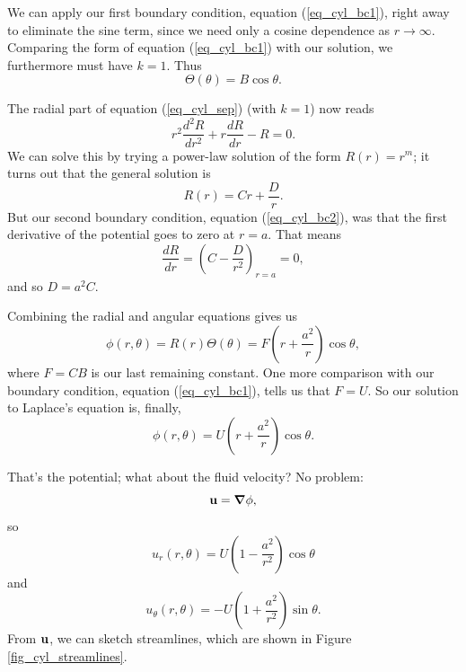 We can apply our first boundary condition, equation (\ref{eq_cyl_bc1}), right away to eliminate the sine term, since we need only a cosine dependence as $r \to \infty$.  Comparing the form of equation (\ref{eq_cyl_bc1}) with our solution, we furthermore must have $k=1$.  Thus 
\begin{equation}
\Theta(\theta) = B \cos \theta.
\end{equation}

The radial part of equation (\ref{eq_cyl_sep}) (with $k = 1$) now reads
\[
r^2 \frac{d^2R}{dr^2} + r \frac{dR}{dr} - R = 0.
\]
We can solve this by trying a power-law solution of the form $R(r) = r^m$; it turns out that the general solution is
\[
R(r) = Cr + \frac{D}{r}.
\]
But our second boundary condition, equation (\ref{eq_cyl_bc2}), was that the first derivative of the potential goes to zero at $r=a$.  That means
\[
\frac{dR}{dr} = \left( C - \frac{D}{r^2} \right)_{r=a} = 0,
\]
and so $D = a^2 C$.

Combining the radial and angular equations gives us
\[
\phi(r, \theta) = R(r) \Theta(\theta) = F \left( r+\frac{a^2}{r} \right) \cos \theta,
\]
where $F=CB$ is our last remaining constant.  One more comparison with our boundary condition, equation (\ref{eq_cyl_bc1}), tells us that $F = U$.  So our solution to Laplace's equation is, finally, 
\begin{equation}
\phi(r, \theta) = U \left( r+\frac{a^2}{r} \right) \cos \theta.
\end{equation}

That's the potential; what about the fluid velocity?  No problem:
\[
\mathbf{u} = \boldsymbol{\nabla} \phi,
\]
so
\begin{equation}
u_r(r, \theta) = U \left( 1 - \frac{a^2}{r^2} \right) \cos \theta
\end{equation}
and
\begin{equation}
u_\theta(r, \theta) = -U \left( 1 + \frac{a^2}{r^2} \right) \sin \theta.
\end{equation}
From $\mathbf{u}$, we can sketch streamlines, which are shown in Figure \ref{fig_cyl_streamlines}.

